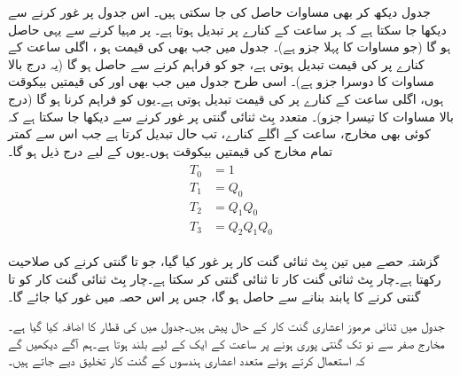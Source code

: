  جدول  دیکھ کر بھی مساوات  حاصل کی جا سکتی ہیں۔ اس جدول پر غور کرنے سے دیکھا جا سکتا ہے کہ  ہر ساعت کے کنارے پر تبدیل ہوتا ہے۔  پر  مہیا کرنے سے یہی حاصل ہو گا (جو مساوات  کا پہلا جزو ہے)۔ جدول میں جب بھی  کی قیمت  ہو ، اگلی ساعت کے کنارے پر  کی قیمت تبدیل ہوتی ہے، جو  کو  فراہم کرنے سے حاصل ہو گا (یہ درج بالا مساوات کا دوسرا جزو ہے)۔ اسی طرح جدول میں جب بھی  اور  کی قیمتیں بیکوقت  ہوں، اگلی ساعت کے کنارے پر  کی قیمت تبدیل ہوتی ہے۔یوں  کو  فراہم کرنا ہو گا (درج بالا مساوات کا تیسرا جزو)۔ متعدد بِٹ ثنائی گنتی پر غور کرنے سے دیکھا جا سکتا ہے کہ کوئی بھی مخارج، ساعت کے اگلے کنارے، تب حال تبدیل کرتا ہے جب اس سے کمتر تمام مخارج کی قیمتیں بیکوقت  ہوں۔یوں  کے لیے درج ذیل ہو گا۔
\begin{gather}
\begin{aligned}\label{مساوات_گنت_کار_چار_بِٹ}
T_0&=1\\
T_1&=Q_0\\
T_2&=Q_1Q_0\\
T_3&=Q_2Q_1Q_0
\end{aligned}
\end{gather}

گزشتہ حصے میں تین بِٹ ثنائی گنت کار پر غور کیا گیا، جو  تا  گنتی کرنے کی صلاحیت رکھتا ہے۔چار بِٹ ثنائی گنت کار  تا  ثنائی گنتی کر سکتا ہے۔چار بِٹ ثنائی گنت کار  کو  تا  گنتی کرنے کا پابند بنانے سے  حاصل ہو گا، جس پر اس حصہ میں غور کیا جائے گا۔

جدول  میں ثنائی  مرموز  اعشاری گنت کار کے حال پیش ہیں۔جدول میں   کی قطار کا اضافہ کیا گیا ہے۔مخارج  صفر سے نو تک گنتی پوری ہونے پر ساعت کے ایک کے لیے بلند ہوتا ہے۔ہم آگے دیکھیں گے کہ  استعمال کرتے ہوئے متعدد اعشاری ہندسوں کے گنت کار تخلیق دیے جاتے ہیں۔

